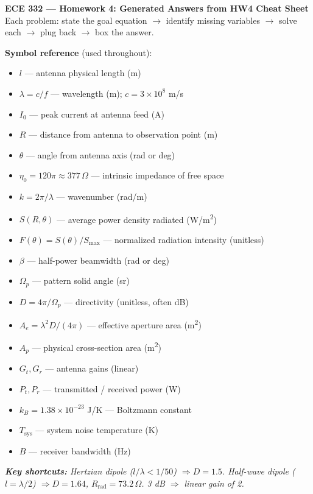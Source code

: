 \documentclass[11pt,letterpaper]{article}
\begin{document}
\begin{center}
{\Large\textbf{ECE 332 --- Homework 4: Generated Answers from HW4 Cheat Sheet}}\\[4pt]
{\small Each problem: state the goal equation $\to$ identify missing variables $\to$ solve each $\to$ plug back $\to$ box the answer.}
\end{center}

\vspace{4pt}

\begin{notebox}
\textbf{Symbol reference} (used throughout):
\begin{itemize}\setlength{\itemsep}{0pt}\setlength{\topsep}{1pt}\setlength{\parsep}{0pt}
\item $l$ --- antenna physical length (m)
\item $\lambda = c/f$ --- wavelength (m); $c=3\!\times\!10^8$ m/s
\item $I_0$ --- peak current at antenna feed (A)
\item $R$ --- distance from antenna to observation point (m)
\item $\theta$ --- angle from antenna axis (rad or deg)
\item $\eta_0 = 120\pi \approx 377\,\Omega$ --- intrinsic impedance of free space
\item $k = 2\pi/\lambda$ --- wavenumber (rad/m)
\item $S(R,\theta)$ --- average power density radiated (W/m\textsuperscript{2})
\item $F(\theta) = S(\theta)/S_{\max}$ --- normalized radiation intensity (unitless)
\item $\beta$ --- half-power beamwidth (rad or deg)
\item $\Omega_p$ --- pattern solid angle (sr)
\item $D = 4\pi/\Omega_p$ --- directivity (unitless, often dB)
\item $A_e = \lambda^2 D/(4\pi)$ --- effective aperture area (m\textsuperscript{2})
\item $A_p$ --- physical cross-section area (m\textsuperscript{2})
\item $G_t, G_r$ --- antenna gains (linear)
\item $P_t, P_r$ --- transmitted / received power (W)
\item $k_B = 1.38\!\times\!10^{-23}$ J/K --- Boltzmann constant
\item $T_{\text{sys}}$ --- system noise temperature (K)
\item $B$ --- receiver bandwidth (Hz)
\end{itemize}
\textit{\color{coral}\textbf{Key shortcuts:} Hertzian dipole ($l/\lambda < 1/50$) $\Rightarrow D = 1.5$. Half-wave dipole ($l = \lambda/2$) $\Rightarrow D = 1.64$, $R_{\text{rad}} = 73.2\,\Omega$. 3 dB $\Rightarrow$ linear gain of 2.}
\end{notebox}
\end{document}
